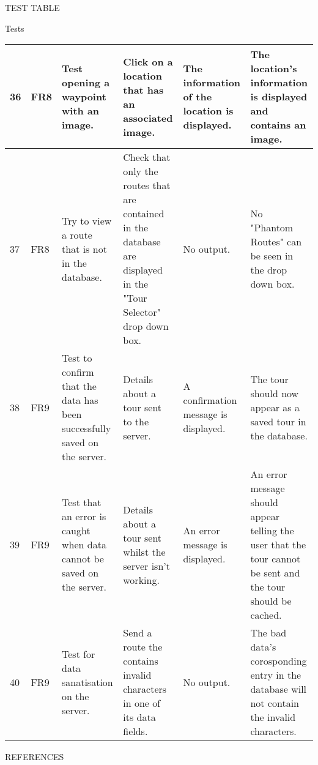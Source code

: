 \documentclass{article}
\begin{document}
\begin{section}{TEST TABLE}
\begin{subsection}{Tests}
\begin{tabularx}{\linewidth}{| p{0.7cm} | p{0.8cm} | p{3cm} | p{3.5cm} | X | X |}
36
&
FR8
&
Test opening a waypoint with an image.
&
Click on a location that has an associated image.
&
The information of the location is displayed.
&
The location's information is displayed and contains an image.
\\
\hline

37
&
FR8
&
Try to view a route that is not in the database.
&
Check that only the routes that are contained in the database are displayed in the "Tour Selector" drop down box.
&
No output.
&
No "Phantom Routes" can be seen in the drop down box.
\\
\hline

38
&
FR9
&
Test to confirm that the data has been successfully saved on the server.
&
Details about a tour sent to the server.
&
A confirmation message is displayed. 
&
The tour should now appear as a saved tour in the database.
\\
\hline

39
&
FR9
&
Test that an error is caught when data cannot be saved  on the server.
&
Details about a tour sent whilst the server isn't working.
&
An error message is displayed.
&
An error message should appear telling the user that the tour cannot be sent and the tour should be cached.
\\
\hline

40
&
FR9
&
Test for data sanatisation on the server.
&
Send a route the contains invalid characters in one of its data fields.
&
No output.
&
The bad data's corosponding entry in the database will not contain the invalid characters.
\\
\hline

			\end{tabularx}
		\end{subsection}
	\end{section}
	
	\nocite{LaTeXTemplate}

	\newpage
	\begin{section}{REFERENCES}
		
		
	\end{section}
	
\end{document}
